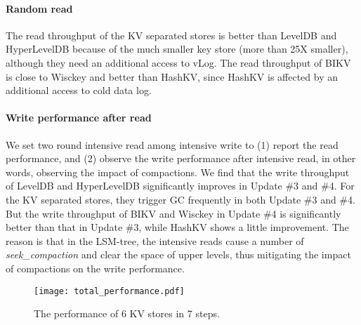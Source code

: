 \documentclass[sigconf]{acmart}
\begin{document}
\paragraph*{Random read} 
{\color{red}{corresponds to which phase?}}
The read throughput of the KV separated stores is better than LevelDB and HyperLevelDB because of the much smaller key store (more than 25X smaller), although they need an additional access to vLog. The read throughput of BIKV is close to Wisckey and better than HashKV, since HashKV is affected by an additional access to cold data log.

\paragraph*{Write performance after read}
We set two round intensive read among intensive write to (1) report the read performance, and (2) observe the write performance after intensive read, in other words, observing the impact of compactions. We find that the write throughput of LevelDB and HyperLevelDB significantly improves in Update \#3 and \#4. For the KV separated stores, they trigger GC frequently in both Update \#3 and \#4. But the write throughput of BIKV and Wisckey in Update \#4 is significantly better than that in Update \#3, while HashKV shows a little improvement. The reason is that in the LSM-tree, the intensive reads cause a number of \textit{seek\_compaction} and clear the space of upper levels, thus mitigating the impact of compactions on the write performance.

\begin{figure}[!t]
	\setlength{\abovecaptionskip}{0.cm}	
	\setlength{\belowcaptionskip}{-0.cm}
	\centering
	\texttt{[image: total\_performance.pdf]}
	\caption{The performance of 6 KV stores in 7 steps.}
	\label{fig:pc}
\end{figure}
\end{document}
